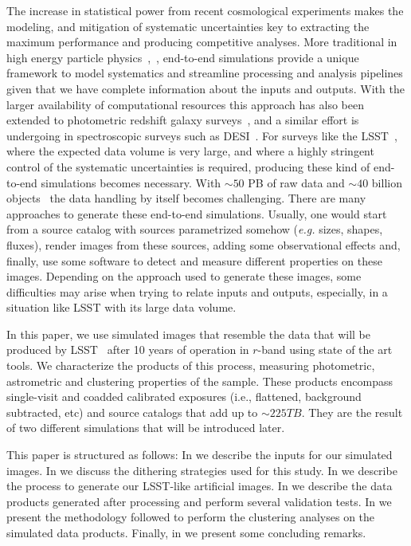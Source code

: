 \documentclass[\docopts]{\docclass}
\begin{document}
The increase in statistical power from recent cosmological experiments makes the modeling, and mitigation of systematic uncertainties key to extracting the maximum performance and producing competitive analyses. More traditional in high energy particle physics~\citep{Brun:118715},~\citep{2006JHEP...05..026S}, end-to-end simulations provide a unique framework to
model systematics and streamline processing and analysis pipelines given that we have complete information about the inputs and outputs. With the larger availability of computational resources this approach has also been extended to photometric redshift galaxy surveys~\citep{2016MNRAS.457..786S,2016ApJ...817...25B}, and a similar effort is undergoing in spectroscopic surveys such as DESI~\citep{2016arXiv161100036D}. For surveys like the LSST~\citep{2008arXiv0805.2366I}, where the expected data volume is very large, and where a highly stringent control of the systematic uncertainties is required, producing these
kind of end-to-end simulations becomes necessary. With $\sim 50$ PB of raw data and $\sim 40$ billion objects~\citep{2008arXiv0805.2366I} the data handling by itself becomes challenging. There are many approaches to generate these end-to-end simulations. Usually, one would start from a source catalog with sources parametrized somehow (\textit{e.g.} sizes, shapes, fluxes), render images from these sources, adding some observational effects and, finally, use some software to detect and measure different properties on these images. Depending on the approach used to generate these images, some difficulties may arise when trying to relate inputs and outputs, especially, in a situation like LSST with its large data volume. 

In this paper, we use simulated images that resemble the data that will be produced by
LSST~\citep{2008arXiv0805.2366I} after 10 years of operation in $r$-band using state of the art tools. We characterize the products of this process, measuring photometric, astrometric and clustering properties of the sample. These products encompass single-visit and coadded calibrated exposures (i.e., flattened, background subtracted, etc) and source catalogs that add up to $\sim 225 TB$. They are the result of two different simulations that will be introduced later.

This paper is structured as follows: In  we describe the inputs for our simulated images. In  we discuss the dithering strategies used for this study. In  we describe the process to generate our LSST-like artificial images. In  we describe the data products generated after processing and perform several validation tests. In  we present the methodology followed to perform the clustering analyses on the simulated data products. Finally, in  we present some concluding remarks.
\end{document}
